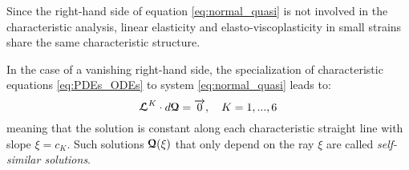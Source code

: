 \begin{remark}
  Since the right-hand side of equation \eqref{eq:normal_quasi} is not involved in the characteristic analysis, linear elasticity and elasto-viscoplasticity in small strains share the same characteristic structure. 
\end{remark}

\begin{remark}
  \label{rq:similarity_solution}
  In the case of a vanishing right-hand side, the specialization of characteristic equations \eqref{eq:PDEs_ODEs} to system \eqref{eq:normal_quasi} leads to:
\begin{equation}
  \label{eq:characteristic_equations_homogeneous}
  {\boldsymbol{\mathcal{L}}}^K \cdot d{\boldsymbol{\mathcal{Q}}} = {\overrightarrow{0}},\quad K=1,...,6
\end{equation}
meaning that the solution is constant along each characteristic straight line with slope $\xi = c_K$. Such solutions ${\boldsymbol{\mathcal{Q}}}(\xi)$ that only depend on the ray $\xi$ are called \textit{self-similar solutions}.
\end{remark}







